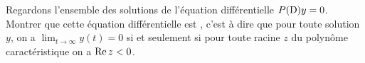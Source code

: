 
\begin{exercice}\label{exoEqsDiff0016}

Regardons l'ensemble des solutions de l'équation différentielle $P({\rm D})y =0$. Montrer que cette équation différentielle est , c'est à dire que pour toute solution $y$, on a $\lim_{t \to \infty} y(t) = 0$ si et seulement si pour toute racine $z$ du polynôme caractéristique on a ${\rm Re}\, z <0$.

\end{exercice}
